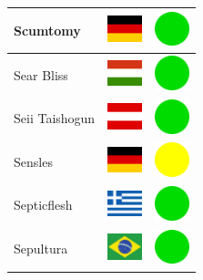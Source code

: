 \documentclass[12pt, a4paper, twoside]{report}
\begin{document}
\begin{center}
\begin{longtable}{|p{5cm}|p{2cm}|p{2cm}|}
 Scumtomy                                                   & \includegraphics[width=1cm]{../4x3/de} &   \includegraphics[width=1cm]{../likes/y} \\ \hline
 Sear Bliss                                                 & \includegraphics[width=1cm]{../4x3/hu} &   \includegraphics[width=1cm]{../likes/y} \\ \hline
 Seii Taishogun                                             & \includegraphics[width=1cm]{../4x3/at} &   \includegraphics[width=1cm]{../likes/y} \\ \hline
 Sensles                                                    & \includegraphics[width=1cm]{../4x3/de} &   \includegraphics[width=1cm]{../likes/m} \\ \hline
 Septicflesh                                                & \includegraphics[width=1cm]{../4x3/gr} &   \includegraphics[width=1cm]{../likes/y} \\ \hline
 Sepultura                                                  & \includegraphics[width=1cm]{../4x3/br} &   \includegraphics[width=1cm]{../likes/y} \\ \hline

\end{longtable}
\end{center}
\end{document}

